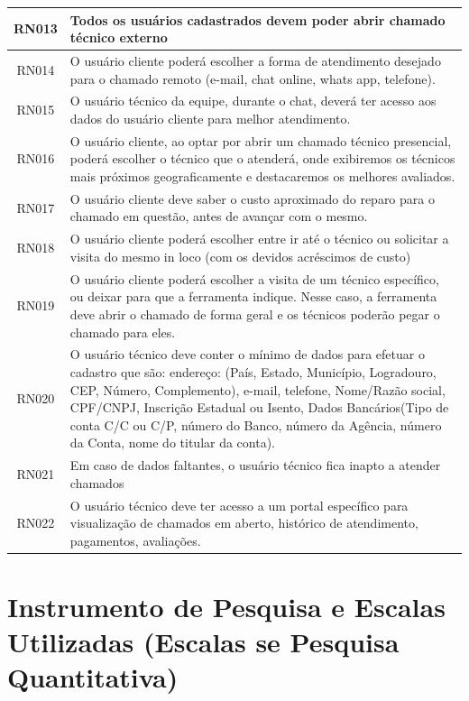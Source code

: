 \begin{table}[htb]
\begin{tabular}{|c|p{14cm}|}
        RN013 & Todos os usuários cadastrados devem poder abrir chamado técnico externo \\ \hline
        RN014 & O usuário cliente poderá escolher a forma de atendimento desejado para o chamado remoto (e-mail, chat online, whats app, telefone). \\ \hline
        RN015 & O usuário técnico da equipe, durante o chat, deverá ter acesso aos dados do usuário cliente para melhor atendimento. \\ \hline
        RN016 & O usuário cliente, ao optar por abrir um chamado técnico presencial, poderá escolher o técnico que o atenderá, onde exibiremos os técnicos mais próximos geograficamente e destacaremos os melhores avaliados. \\ \hline
        RN017 & O usuário cliente deve saber o custo aproximado do reparo para o chamado em questão, antes de avançar com o mesmo. \\ \hline
        RN018 & O usuário cliente poderá escolher entre ir até o técnico ou solicitar a visita do mesmo in loco (com os devidos acréscimos de custo) \\ \hline
        RN019 & O usuário cliente poderá escolher a visita de um técnico específico, ou deixar para que a ferramenta indique. Nesse caso, a ferramenta deve abrir o chamado de forma geral e os técnicos poderão pegar o chamado para eles. \\ \hline
        RN020 & O usuário técnico deve conter o mínimo de dados para efetuar o cadastro que são: endereço: (País, Estado, Município, Logradouro, CEP, Número, Complemento), e-mail, telefone, Nome/Razão social, CPF/CNPJ, Inscrição Estadual ou Isento, Dados Bancários(Tipo de conta C/C ou C/P, número do Banco, número da Agência, número da Conta, nome do titular da conta). \\ \hline
        RN021 & Em caso de dados faltantes, o usuário técnico fica inapto a atender chamados \\ \hline
        RN022 & O usuário técnico deve ter acesso a um portal específico para visualização de chamados em aberto, histórico de atendimento, pagamentos, avaliações. \\ \hline
    \end{tabular}
\end{table}

\section{Instrumento de Pesquisa e Escalas Utilizadas (Escalas se Pesquisa Quantitativa)}
\preencheComTexto

